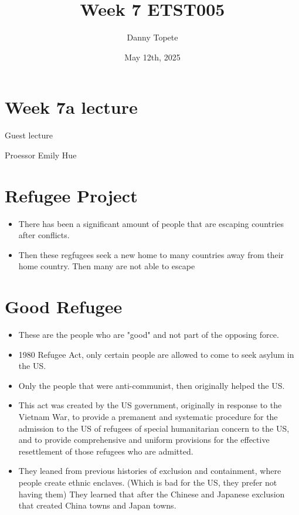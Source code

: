 \documentclass{article}
\title{Week 7 ETST005}
\author{Danny Topete}
\date{May 12th, 2025}
\begin{document}
\maketitle

\section*{Week 7a lecture}
Guest lecture

Proessor Emily Hue


\section{Refugee Project}
\begin{itemize}
  \item There has been a significant amount of people that are
    escaping countries after conflicts.
  \item Then these regfugees seek a new home to many countries away
    from their home country. Then many are not able to escape
\end{itemize}

\section{Good Refugee}

\begin{itemize}
  \item These are the people who are "good" and not
    part of the opposing force.
  \item 1980 Refugee Act, only certain people are allowed
    to come to seek asylum in the US.
  \item Only the people that were anti-communist, then originally helped
    the US.
  \item This act was created by the US government, originally in response to the
    Vietnam War, to provide a premanent and systematic procedure for the admission
    to the US of refugees of special humanitarian concern to the US,
    and to provide comprehensive and uniform provisions for the 
    effective resettlement of those refugees who are admitted.
  \item They leaned from previous histories of exclusion and containment, where
    people create ethnic enclaves. (Which is bad for the US, they prefer not having them)
    They learned that after the Chinese and Japanese exclusion that created
    China towns and Japan towns.
\end{itemize}
\end{document}
